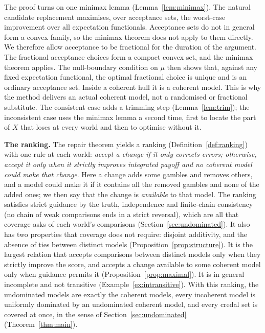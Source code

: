 \documentclass[11pt]{article}
\theoremstyle{plain}
\theoremstyle{definition}
\theoremstyle{remark}
\begin{document}
The proof turns on one minimax lemma (Lemma~\ref{lem:minimax}). The natural candidate
replacement maximises, over acceptance sets, the worst-case improvement over all expectation
functionals. Acceptance sets do not in general form a convex family, so the minimax theorem
does not apply to them directly. We therefore allow acceptance to be fractional for the
duration of the argument. The fractional acceptance choices form a compact convex set, and the
minimax theorem applies. The null-boundary condition on $\mu$ then shows that, against any
fixed expectation functional, the optimal fractional choice is unique and is an ordinary
acceptance set. Inside a coherent hull it is a coherent model. This is why the method delivers
an actual coherent model, not a randomised or fractional substitute. The consistent case adds
a trimming step (Lemma~\ref{lem:trim}); the inconsistent case uses the minimax lemma a second
time, first to locate the part of $X$ that loses at every world and then to optimise without
it.

\smallskip\noindent\textbf{The ranking.} The repair theorem yields a ranking
(Definition~\ref{def:ranking}) with one rule at each world: \emph{accept a change if it only
corrects errors; otherwise, accept it only when it strictly improves integrated payoff and no
coherent model could make that change}. Here a change adds some gambles and removes others, and
a model could make it if it contains all the removed gambles and none of the added ones; we
then say that the change is \emph{available} to that model. The ranking satisfies strict
guidance by the truth, independence and finite-chain consistency (no chain of weak comparisons
ends in a strict reversal), which are all that coverage asks of each world's comparisons
(Section~\ref{sec:undominated}). It also has two properties that coverage does not require:
disjoint additivity, and the absence of ties between distinct models
(Proposition~\ref{prop:structure}). It is the largest relation that
accepts comparisons between distinct models only when they strictly improve the score, and
accepts a change available to some coherent model only when guidance permits it
(Proposition~\ref{prop:maximal}). It is in general incomplete and not transitive
(Example~\ref{ex:intransitive}). With this ranking, the undominated models are exactly the
coherent models, every incoherent model is uniformly dominated by an undominated coherent
model, and every credal set is covered at once, in the sense of Section~\ref{sec:undominated}
(Theorem~\ref{thm:main}).
\end{document}
